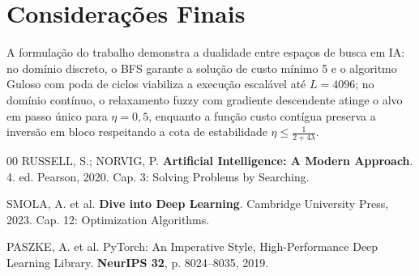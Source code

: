 \documentclass[
	12pt,
	a4paper,
	article,
	twocolumn,
	brazil
]{abntex2}
\begin{document}
\section{Considerações Finais}

A formulação do trabalho demonstra a dualidade entre espaços de busca em IA: no domínio discreto, o BFS garante a solução de custo mínimo 5 e o algoritmo Guloso com poda de ciclos viabiliza a execução escalável até $L = 4096$; no domínio contínuo, o relaxamento fuzzy com gradiente descendente atinge o alvo em passo único para $\eta = 0{,}5$, enquanto a função custo contígua preserva a inversão em bloco respeitando a cota de estabilidade $\eta \le \frac{1}{2 + 4\lambda}$.

\begin{thebibliography}{00}
\footnotesize
\setlength{\itemsep}{0pt}
\setlength{\parskip}{0pt}
RUSSELL, S.; NORVIG, P. \textbf{Artificial Intelligence: A Modern Approach}. 4. ed. Pearson, 2020. Cap. 3: Solving Problems by Searching.

SMOLA, A. et al. \textbf{Dive into Deep Learning}. Cambridge University Press, 2023. Cap. 12: Optimization Algorithms.

PASZKE, A. et al. PyTorch: An Imperative Style, High-Performance Deep Learning Library. \textbf{NeurIPS 32}, p. 8024--8035, 2019.
\end{thebibliography}
\end{document}
